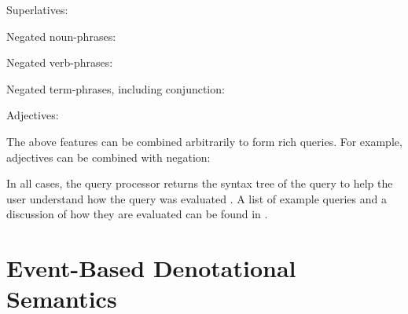 \documentclass[../main.tex]{subfiles}
\begin{document}
\begin{refsection}
\examplespacing


\noindent Superlatives:

\examplespacing


\examplespacing

\noindent Negated noun-phrases:

\examplespacing


\examplespacing

\noindent Negated verb-phrases:

\examplespacing


\examplespacing

\noindent Negated term-phrases, including conjunction:

\examplespacing


\examplespacing

\noindent Adjectives:

\examplespacing


\examplespacing

\noindent The above features can be combined arbitrarily to form rich queries.
For example, adjectives can be combined with negation:

\examplespacing


\examplespacing

\noindent In all cases, the query processor returns the syntax tree of the query to help the user understand how the query was evaluated \cite{peelar2020compositional}.  A list of example queries and a discussion of how they are evaluated can be found in .




\section{Event-Based Denotational Semantics}
\label{webist2020conf:event}


\end{refsection}
\end{document}
